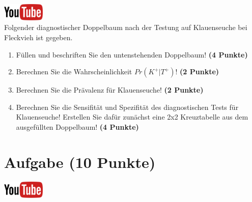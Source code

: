 \documentclass[a4paper, 10pt]{scrartcl}\usepackage[]{graphicx}\usepackage[]{xcolor}
\begin{document}
\hfill\href{https://youtu.be/_7s44pbOc00}{\includegraphics[width =
  2cm]{img/youtube}}\\[1Ex]





Folgender diagnostischer Doppelbaum nach der Testung auf Klauenseuche bei
Fleckvieh ist gegeben.

\begin{enumerate}
\item F{\"u}llen und beschriften Sie den untenstehenden Doppelbaum! \textbf{(4
    Punkte)}
\item Berechnen Sie die Wahrscheinlichkeit $Pr(K^+|T^+)$! \textbf{(2 Punkte)}
\item Berechnen Sie die Pr{\"a}valenz f{\"u}r Klauenseuche! \textbf{(2 Punkte)}
\item Berechnen Sie die Sensifit{\"a}t und Spezifit{\"a}t des diagnostischen Tests
  f{\"u}r Klauenseuche! Erstellen Sie daf{\"u}r zun{\"a}chst eine 2x2 Kreuztabelle aus
  dem ausgef{\"u}llten Doppelbaum!
  \textbf{(4 Punkte)}
\end{enumerate}

\vspace{1cm}
 




 
\clearpage

\section{Aufgabe \hfill (10 Punkte)}

\hfill\href{https://youtu.be/G-_r2KplGTI}{\includegraphics[width =
  2cm]{img/youtube}}\\[1Ex]
\end{document}
